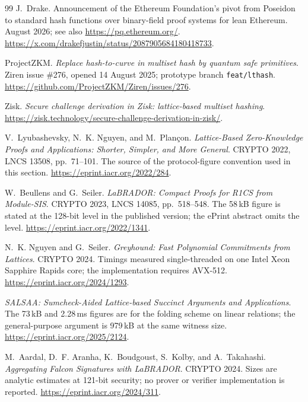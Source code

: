 \begin{thebibliography}{99}
 J.~Drake.
\newblock Announcement of the Ethereum Foundation's pivot from Poseidon to
standard hash functions over binary-field proof systems for lean Ethereum.
\newblock August 2026; see also \url{https://pq.ethereum.org/}.
\newblock \url{https://x.com/drakefjustin/status/2087905684180418733}.

 ProjectZKM.
\newblock \emph{Replace hash-to-curve in multiset hash by quantum safe primitives}.
\newblock Ziren issue \#276, opened 14 August 2025; prototype branch \texttt{feat/lthash}.
\newblock \url{https://github.com/ProjectZKM/Ziren/issues/276}.

 Zisk.
\newblock \emph{Secure challenge derivation in Zisk: lattice-based multiset hashing}.
\newblock \url{https://zisk.technology/secure-challenge-derivation-in-zisk/}.

 V.~Lyubashevsky, N.~K. Nguyen, and M.~Plan\c{c}on.
\newblock \emph{Lattice-Based Zero-Knowledge Proofs and Applications: Shorter,
Simpler, and More General}.
\newblock CRYPTO 2022, LNCS 13508, pp.~71--101.
\newblock The source of the protocol-figure convention used in this section.
\newblock \url{https://eprint.iacr.org/2022/284}.

 W.~Beullens and G.~Seiler.
\newblock \emph{LaBRADOR: Compact Proofs for R1CS from Module-SIS}.
\newblock CRYPTO 2023, LNCS 14085, pp.~518--548.
\newblock The 58\,kB figure is stated at the 128-bit level in the published
version; the ePrint abstract omits the level.
\newblock \url{https://eprint.iacr.org/2022/1341}.

 N.~K. Nguyen and G.~Seiler.
\newblock \emph{Greyhound: Fast Polynomial Commitments from Lattices}.
\newblock CRYPTO 2024.
\newblock Timings measured single-threaded on one Intel Xeon Sapphire Rapids
core; the implementation requires AVX-512.
\newblock \url{https://eprint.iacr.org/2024/1293}.

 \emph{SALSAA: Sumcheck-Aided Lattice-based Succinct
Arguments and Applications}.
\newblock The 73\,kB and 2.28\,ms figures are for the folding scheme on linear
relations; the general-purpose argument is 979\,kB at the same witness size.
\newblock \url{https://eprint.iacr.org/2025/2124}.

 M.~Aardal, D.~F. Aranha, K.~Boudgoust, S.~Kolby, and
A.~Takahashi.
\newblock \emph{Aggregating Falcon Signatures with LaBRADOR}.
\newblock CRYPTO 2024.
\newblock Sizes are analytic estimates at 121-bit security; no prover or
verifier implementation is reported.
\newblock \url{https://eprint.iacr.org/2024/311}.


\end{thebibliography}

